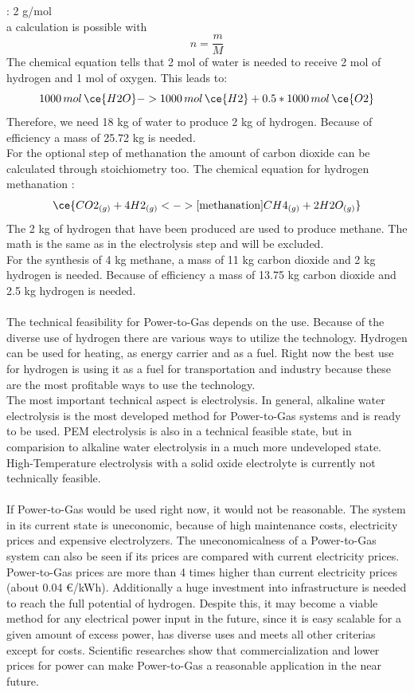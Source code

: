 \begin{parcolumns}[colwidths={1=2.5 cm, 2=10 cm, 3=2.5 cm}]{3}
{ : 2 g/mol \\
a calculation is possible with \[ n = \dfrac{m}{M} \] The chemical equation tells that 2 mol of water is needed to receive 2 mol of hydrogen and 1 mol of oxygen. This leads to:
\[ 1000 \, mol \, \ce{H2O} -> 1000 \,  mol \,  \ce{H2} + 0.5*1000 \, mol \, \ce{O2} \]
Therefore, we need 18 kg of water to produce 2 kg of hydrogen. Because of efficiency a mass of 25.72 kg is needed. \\
For the optional step of methanation the amount of carbon dioxide can be calculated through stoichiometry too.
The chemical equation for hydrogen methanation :
\[\ce{CO2_{(g)} +  4H2_{(g)} <->[\text{methanation}]  CH4_{(g)} + 2H2O_{(g)}}\] 
The 2 kg of hydrogen that have been produced are used to produce methane. The math is the same as in the electrolysis step and will be excluded. \\
For the synthesis of 4 kg methane, a mass of 11 kg carbon dioxide and 2 kg hydrogen is needed. Because of efficiency a mass of 13.75 kg carbon dioxide and 2.5 kg hydrogen is needed.
\\ \\
The technical feasibility for Power-to-Gas depends on the use. Because of the diverse use of hydrogen there are various ways to utilize the technology. Hydrogen can be used for heating, as energy carrier and as a fuel. Right now the best use for hydrogen is using it as a fuel for transportation and industry because these are the most profitable ways to use the technology. \\
The most important technical aspect is electrolysis. In general, alkaline water electrolysis is the most developed method for Power-to-Gas systems and is ready to be used. PEM electrolysis is also in a technical feasible state, but in comparision to alkaline water electrolysis in a much more undeveloped state. High-Temperature electrolysis with a solid oxide electrolyte is currently not technically feasible. 
\\ \\ 
If Power-to-Gas would be used right now, it would not be reasonable. The system in its current state is uneconomic, because of high maintenance costs, electricity prices and expensive electrolyzers. The uneconomicalness of a Power-to-Gas system can also be seen if its prices are compared with current electricity prices. Power-to-Gas prices are more than 4 times higher than current electricity prices (about 0.04 \euro /kWh). Additionally a huge investment into infrastructure is needed to reach the full potential of hydrogen. Despite this, it may become a viable method for any electrical power input in the future, since it is easy scalable for a given amount of excess power, has diverse uses and meets all other criterias except for costs. Scientific researches show that commercialization and lower prices for power can make Power-to-Gas a reasonable application in the near future. 
}
\end{parcolumns}
